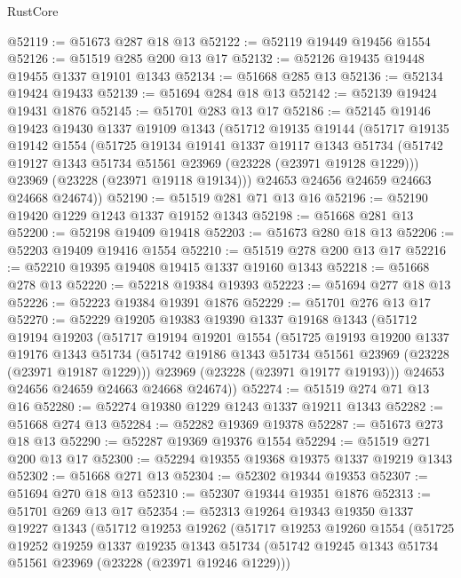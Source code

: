 \begin{lexlean}{RustCore}
\begin{coremodule}
@52119 := @51673 @287 @18 @13
@52122 := @52119 @19449 @19456 @1554
@52126 := @51519 @285 @200 @13 @17
@52132 := @52126 @19435 @19448 @19455 @1337 @19101 @1343
@52134 := @51668 @285 @13
@52136 := @52134 @19424 @19433
@52139 := @51694 @284 @18 @13
@52142 := @52139 @19424 @19431 @1876
@52145 := @51701 @283 @13 @17
@52186 := @52145
    @19146
    @19423
    @19430
    @1337
    @19109
    @1343
    (@51712
      @19135
      @19144
      (@51717
        @19135
        @19142
        @1554
        (@51725
          @19134
          @19141
          @1337
          @19117
          @1343
          @51734
          (@51742 @19127 @1343 @51734 @51561 @23969 (@23228 (@23971 @19128 @1229)))
          @23969
          (@23228 (@23971 @19118 @19134)))
        @24653
        @24656
        @24659
        @24663
        @24668
        @24674))
@52190 := @51519 @281 @71 @13 @16
@52196 := @52190 @19420 @1229 @1243 @1337 @19152 @1343
@52198 := @51668 @281 @13
@52200 := @52198 @19409 @19418
@52203 := @51673 @280 @18 @13
@52206 := @52203 @19409 @19416 @1554
@52210 := @51519 @278 @200 @13 @17
@52216 := @52210 @19395 @19408 @19415 @1337 @19160 @1343
@52218 := @51668 @278 @13
@52220 := @52218 @19384 @19393
@52223 := @51694 @277 @18 @13
@52226 := @52223 @19384 @19391 @1876
@52229 := @51701 @276 @13 @17
@52270 := @52229
    @19205
    @19383
    @19390
    @1337
    @19168
    @1343
    (@51712
      @19194
      @19203
      (@51717
        @19194
        @19201
        @1554
        (@51725
          @19193
          @19200
          @1337
          @19176
          @1343
          @51734
          (@51742 @19186 @1343 @51734 @51561 @23969 (@23228 (@23971 @19187 @1229)))
          @23969
          (@23228 (@23971 @19177 @19193)))
        @24653
        @24656
        @24659
        @24663
        @24668
        @24674))
@52274 := @51519 @274 @71 @13 @16
@52280 := @52274 @19380 @1229 @1243 @1337 @19211 @1343
@52282 := @51668 @274 @13
@52284 := @52282 @19369 @19378
@52287 := @51673 @273 @18 @13
@52290 := @52287 @19369 @19376 @1554
@52294 := @51519 @271 @200 @13 @17
@52300 := @52294 @19355 @19368 @19375 @1337 @19219 @1343
@52302 := @51668 @271 @13
@52304 := @52302 @19344 @19353
@52307 := @51694 @270 @18 @13
@52310 := @52307 @19344 @19351 @1876
@52313 := @51701 @269 @13 @17
@52354 := @52313
    @19264
    @19343
    @19350
    @1337
    @19227
    @1343
    (@51712
      @19253
      @19262
      (@51717
        @19253
        @19260
        @1554
        (@51725
          @19252
          @19259
          @1337
          @19235
          @1343
          @51734
          (@51742 @19245 @1343 @51734 @51561 @23969 (@23228 (@23971 @19246 @1229)))

\end{coremodule}
\end{lexlean}
